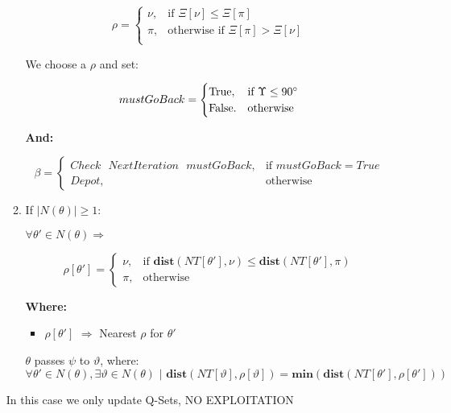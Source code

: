 \documentclass[12pt]{article}
\begin{document}
\begin{itemize}
\begin{enumerate}
        \[
            \rho = 
            \begin{cases}
                \nu,& \text{if } \Xi[\nu] \leq \Xi[\pi] \\
                \pi,& \text{otherwise if } \Xi[\pi] > \Xi[\nu] \\
            \end{cases}
        \]
    
        
        We choose a $\rho$ and set:
        
        \[
            mustGoBack =
            \begin{cases}
                \text{True},& \text{if } \Upsilon \leq 90\degree \\
                \text{False}.& \text{otherwise}
            \end{cases}
        \]
        
        \textbf{And:}
        
        \[
        \beta =
        \begin{cases}
            \text {$Check$ $NextIteration$ $mustGoBack$},& \text{if } mustGoBack = True \\
            \text{$Depot$},& \text{otherwise}
        \end{cases}
        \]
        
        \item If $|N(\theta)| \geq 1$:
        
        $\forall\theta' \in N(\theta) \Rightarrow$
        
        \[
            \rho[\theta'] =
            \begin{cases}
                \nu,& \text{if } \textbf{dist}(NT[\theta'], \nu) \leq \textbf{dist}(NT[\theta'], \pi) \\
                \pi,& \text{otherwise}
            \end{cases}
        \]
        
        \textbf{Where:}
        
        \begin{itemize}
        
            \item $\rho[\theta']$ $\Rightarrow$ Nearest $\rho$ for $\theta'$
        
        \end{itemize}
        
        $\theta$ passes $\psi$ to $\vartheta$, where:
        \[
            \forall\theta' \in N(\theta), \exists\vartheta \in N(\theta) \textbf{ | }\textbf{dist}(NT[\vartheta], \rho[\vartheta]) = \textbf{min}(\textbf{dist}(NT[\theta'], \rho[\theta']))
        \]
        
        
        
    \end{enumerate}
    
    In this case we only update Q-Sets, NO EXPLOITATION
    
\end{itemize}
    
\end{document}
